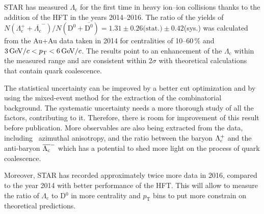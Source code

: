 % 
% 
% 

STAR has measured $\Lambda_\mathrm{c}$ for the first time in heavy ion--ion collisions thanks to the addition of the HFT in the years 2014--2016. The ratio of the yields of $N(\Lambda_\mathrm{c}^+ + \overline{\Lambda_\mathrm{c}}^-)/N(\mathrm{D^0 + \overline{D^0}}) = 1.31 \pm 0.26\text{(stat.)} \pm 0.42$(sys.)  was calculated from the Au+Au data taken in 2014 for centralities of 10--60$\,\%$ and $\SI{3}{\giga\electronvolt}/c < {}p_{\mathrm{T}}{} < \SI{6}{\giga\electronvolt}/c$\@. The results point to an enhancement of the $\Lambda_\mathrm{c}$ within the measured range and are consistent within 2$\sigma$ with theoretical calculations that contain quark coalescence.

The statistical uncertainty can be improved by a better cut optimization and by using the mixed-event method for the extraction of the combinatorial background. The systematic uncertainty needs a more thorough study of all the factors, contributing to it. Therefore, there is room for improvement of this result before publication. More observables are also being extracted from the data, including \Lambdac\ azimuthal anisotropy, and the ratio between the baryon $\Lambda_\text{c}^+$ and the anti-baryon $\overline{\Lambda_\text{c}}^-$ which has a potential to shed more light on the process of quark coalescence.

Moreover, STAR has recorded approximately twice more data in 2016, compared to the year 2014 with better performance of the HFT\@. This will allow to measure the ratio of $\Lambda_\mathrm{c}$ to D$^0$ in more centrality and $p_\mathrm{T}$ bins to put more constrain on theoretical predictions. 
